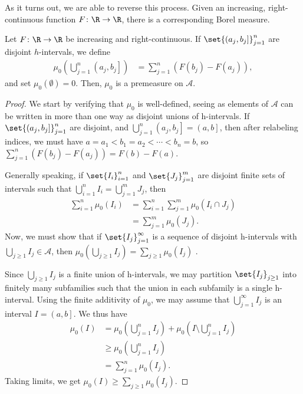 \documentclass[10pt]{mypackage}
\begin{document}
As it turns out, we are able to reverse this process. Given an increasing, right-continuous function $F\colon \R\rightarrow \R$, there is a corresponding Borel measure.
\begin{proposition}
  Let $F\colon \R\rightarrow \R$ be increasing and right-continuous. If $\set{\left( a_j,b_j \right]}_{j=1}^{n}$ are disjoint $h$-intervals, we define
  \begin{align*}
    \mu_0\left( \bigcup_{j=1}^{n} \left( a_j,b_j \right] \right) &= \sum_{j=1}^{n} \left( F\left( b_j \right)-F\left( a_j \right) \right),
  \end{align*}
  and set $\mu_0\left( \emptyset \right) = 0$. Then, $\mu_0$ is a premeasure on $\mathcal{A}$.
\end{proposition}
\begin{proof}
  We start by verifying that $\mu_0$ is well-defined, seeing as elements of $\mathcal{A}$ can be written in more than one way as disjoint unions of h-intervals. If $\set{\left( a_j,b_j \right]}_{j=1}^{n}$ are disjoint, and $\bigcup_{j=1}^{n}\left( a_j,b_j \right] = \left( a,b \right]$, then after relabeling indices, we must have $a = a_1 < b_1 = a_2 < \cdots < b_n = b$, so $\sum_{j=1}^{n}\left( F\left( b_j \right)-F\left( a_j \right) \right) = F\left( b \right)-F\left( a \right)$.\newline

  Generally speaking, if $\set{I_i}_{i=1}^{n}$ and $\set{J_j}_{j=1}^{m}$ are disjoint finite sets of intervals such that $\bigcup_{i=1}^{n}I_i = \bigcup_{j=1}^{m}J_j$, then
  \begin{align*}
    \sum_{i=1}^{n}\mu_0\left( I_i \right) &= \sum_{i=1}^{n}\sum_{j=1}^{m} \mu_0\left( I_i\cap J_j \right)\\
                                          &= \sum_{j=1}^{m} \mu_0\left( J_j \right).
  \end{align*}
  Now, we must show that if $\set{I_j}_{j=1}^{\infty}$ is a sequence of disjoint h-intervals with $\bigcup_{j\geq 1}I_j \in \mathcal{A}$, then $\mu_0\left( \bigcup_{j\geq 1}I_j \right) = \sum_{j\geq 1}\mu_0\left( I_j \right)$ .\newline

  Since $\bigcup_{j\geq 1}I_j$ is a finite union of h-intervals, we may partition $\set{I_j}_{j\geq 1}$ into finitely many subfamilies such that the union in each subfamily is a single h-interval. Using the finite additivity of $\mu_0$, we may assume that $\bigcup_{j=1}^{\infty} I_j $ is an interval $I = \left( a,b \right]$. We thus have
  \begin{align*}
    \mu_0\left( I \right) &= \mu_0\left( \bigcup_{j=1}^{n}I_j \right) + \mu_0\left( I\setminus \bigcup_{j=1}^{n}I_j \right)\\
                          &\geq \mu_0\left( \bigcup_{j=1}^{n}I_j \right)\\
                          &= \sum_{j=1}^{n}\mu_0\left( I_j \right).
  \end{align*}
  Taking limits, we get $\mu_0\left( I \right) \geq \sum_{j\geq1} \mu_0\left( I_j \right)$.\newline


\end{proof}
\end{document}

